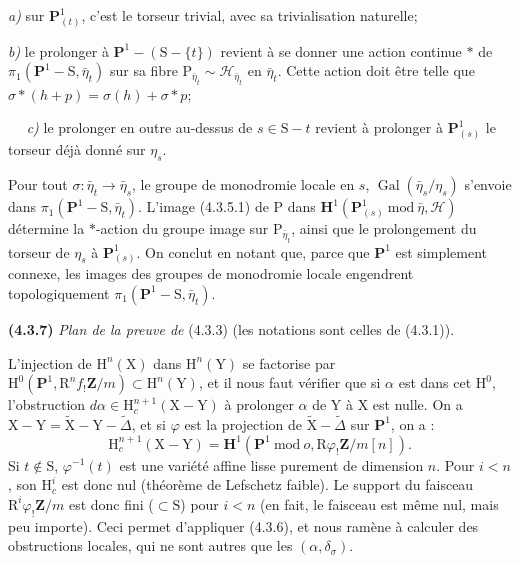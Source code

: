\documentclass[11pt,leqno]{article}
\newcommand{\Page}[1]{\ifvmode\noindent\else\unskip\ \fi{\footnotesize\textcolor{gray}{[p.\,#1]}}\ \ignorespaces}
\begin{document}
\noindent\textit{a)} sur \(\mathbf{P}^1_{(t)}\), c’est le torseur trivial, avec sa trivialisation naturelle;

\noindent\textit{b)} le prolonger à \(\mathbf{P}^1-(\mathrm{S}-\{t\})\) revient à se donner une action continue \(\ast\) de \(\pi_1(\mathbf{P}^1-\mathrm{S},\bar\eta_t)\) sur sa fibre \(\mathrm{P}_{\bar\eta_t}\sim\mathscr{H}_{\bar\eta_t}\) en \(\bar\eta_t\). Cette action doit être telle que \(\sigma\ast(h+p)=\sigma(h)+\sigma\ast p\);

\Page{225}
\noindent\textit{c)} le prolonger en outre au-dessus de \(s\in\mathrm{S}-t\) revient à prolonger à \(\mathbf{P}^1_{(s)}\) le torseur déjà donné sur \(\eta_s\).

Pour tout \(\sigma:\bar{\eta}_t\to\bar{\eta}_s\), le groupe de monodromie locale en \(s\), \(\operatorname{Gal}(\bar{\eta}_s/\eta_s)\) s’envoie dans \(\pi_1(\mathbf{P}^1-\mathrm{S},\bar{\eta}_t)\). L’image (4.3.5.1) de \(\mathrm{P}\) dans \(\mathbf{H}^1(\mathbf{P}^1_{(s)}\ \mathrm{mod}\ \bar{\eta},\mathscr{H})\) détermine la \(*\)-action du groupe image sur \(\mathrm{P}_{\bar{\eta}_t}\), ainsi que le prolongement du torseur de \(\eta_s\) à \(\mathbf{P}^1_{(s)}\). On conclut en notant que, parce que \(\mathbf{P}^1\) est simplement connexe, les images des groupes de monodromie locale engendrent topologiquement \(\pi_1(\mathbf{P}^1-\mathrm{S},\bar{\eta}_t)\).

\textbf{(4.3.7)} \textit{Plan de la preuve de} (4.3.3) (les notations sont celles de (4.3.1)).

L’injection de \(\mathrm{H}^n(\mathrm{X})\) dans \(\mathrm{H}^n(\mathrm{Y})\) se factorise par \(\mathrm{H}^0(\mathbf{P}^1,\mathrm{R}^nf_!\mathbf{Z}/m)\subset\mathrm{H}^n(\mathrm{Y})\), et il nous faut vérifier que si \(\alpha\) est dans cet \(\mathrm{H}^0\), l’obstruction \(d\alpha\in\mathrm{H}_c^{n+1}(\mathrm{X}-\mathrm{Y})\) à prolonger \(\alpha\) de \(\mathrm{Y}\) à \(\mathrm{X}\) est nulle. On a \(\mathrm{X}-\mathrm{Y}=\widetilde{\mathrm{X}}-\mathrm{Y}-\widetilde{\Delta}\), et si \(\varphi\) est la projection de \(\widetilde{\mathrm{X}}-\widetilde{\Delta}\) sur \(\mathbf{P}^1\), on a :
\[
\mathrm{H}_c^{n+1}(\mathrm{X}-\mathrm{Y})
=\mathbf{H}^1(\mathbf{P}^1\ \mathrm{mod}\ o,\mathrm{R}\varphi_!\mathbf{Z}/m[n]).
\]
Si \(t\notin\mathrm{S}\), \(\varphi^{-1}(t)\) est une variété affine lisse purement de dimension \(n\). Pour \(i<n\), son \(\mathrm{H}_c^i\) est donc nul (théorème de Lefschetz faible). Le support du faisceau \(\mathrm{R}^i\varphi_!\mathbf{Z}/m\) est donc fini (\(\subset\mathrm{S}\)) pour \(i<n\) (en fait, le faisceau est même nul, mais peu importe). Ceci permet d’appliquer (4.3.6), et nous ramène à calculer des obstructions locales, qui ne sont autres que les \((\alpha,\delta_\sigma)\).
\end{document}
